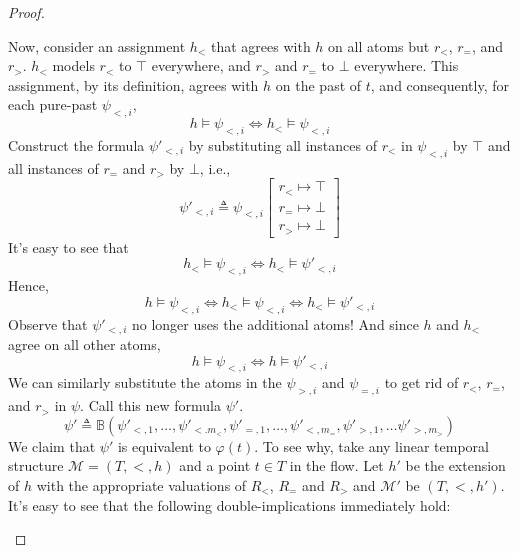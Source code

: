 \documentclass[a4paper,UKenglish,cleveref, autoref, thm-restate, numberwithinsect]{lipics-v2021}
\begin{document}
\begin{proof}
\begin{description}
        Now, consider an assignment $h_<$ that agrees with $h$ on all atoms but $r_<$, $r_=$, and $r_>$. $h_<$ models $r_<$ to $\top$ everywhere, and $r_>$ and $r_=$ to $\bot$ everywhere. This assignment, by its definition, agrees with $h$ on the past of $t$, and consequently, for each pure-past $\psi_{<, i}$,
        \begin{equation*}
            h \vDash \psi_{<, i} \Longleftrightarrow h_< \vDash \psi_{<, i}
        \end{equation*}
        Construct the formula $\psi'_{<, i}$ by substituting all instances of $r_<$ in $\psi_{<, i}$ by $\top$ and all instances of $r_=$ and $r_>$ by $\bot$, i.e.,
        \begin{equation*}
            \psi'_{<, i} \triangleq \psi_{<, i} \left[ \begin{smallmatrix}
                r_< \mapsto \top\\
                r_= \mapsto \bot\\
                r_> \mapsto \bot
            \end{smallmatrix} \right]
        \end{equation*}
        It's easy to see that
        \begin{equation*}
            h_< \vDash \psi_{<, i} \Longleftrightarrow h_< \vDash \psi'_{<, i}
        \end{equation*}
        Hence,
        \begin{equation*}
            h \vDash \psi_{<, i} \Longleftrightarrow h_< \vDash \psi_{<, i} \Longleftrightarrow h_< \vDash \psi'_{<, i}
        \end{equation*}
        Observe that $\psi'_{<, i}$ no longer uses the additional atoms! And since $h$ and $h_<$ agree on all other atoms,
        \begin{equation*}
            h \vDash \psi_{<, i} \Longleftrightarrow h \vDash \psi'_{<, i}
        \end{equation*}
        We can similarly substitute the atoms in the $\psi_{>, i}$ and $\psi_{=, i}$ to get rid of $r_<$, $r_=$, and $r_>$ in $\psi$. Call this new formula $\psi'$.
        \begin{equation*}
            \psi' \triangleq \mathbb{B}(\psi'_{<, 1}, \ldots, \psi'_{<. m_<}, \psi'_{=, 1}, \ldots, \psi'_{<, m_=}, \psi'_{>, 1}, \ldots \psi'_{>, m_>})
        \end{equation*}
        We claim that $\psi'$ is equivalent to $\varphi(t)$. To see why, take any linear temporal structure $\mathcal{M} = (T, <, h)$ and a point $t \in T$ in the flow. Let $h'$ be the extension of $h$ with the appropriate valuations of $R_<$, $R_=$ and $R_>$ and $\mathcal{M}'$ be $(T, <, h')$. It's easy to see that the following double-implications immediately hold:

\end{description}
\end{proof}
\end{document}
